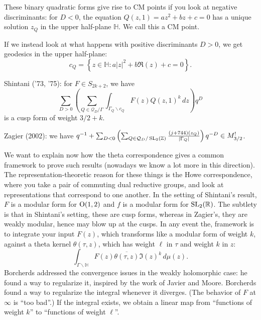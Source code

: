 \documentclass[reqno]{amsart} 
\numberwithin{theorem}{section}
\numberwithin{equation}{section}
\begin{document}
These binary quadratic forms give rise to CM points if you look at negative discriminants: for $D < 0$, the equation $Q(z, 1) = a z^2 + b z + c = 0$ has a unique solution $z_Q$ in the upper half-plane $\mathbb{H}$.  We call this a CM point.

If we instead look at what happens with positive discriminants $D > 0$, we get geodesics in the upper half-plane:
\begin{equation*}
  c_Q = \left\{ z \in \mathbb{H} : a \lvert z \rvert^2 + b \Re(z) + c = 0 \right\}.
\end{equation*}

Shintani ('73, '75): for $F \in S_{2 k + 2}$, we have
\begin{equation*}
  \sum_{D > 0} \left( \sum_{Q \in \mathcal{Q}_D / \Gamma}
    \int_{\Gamma_Q \backslash c_Q}
    F(z) Q(z, 1)^k \, d z
  \right) q^D
\end{equation*}
is a cusp form of weight $3/2 + k$.

Zagier (2002): we have $q^{-1} + \sum_{D < 0} \left( \sum_{Q \in \mathcal{Q}_D / \operatorname{SL}_2(\mathbb{Z})} \frac{(j + 744)(z_Q)}{\lvert \Gamma_Q \rvert} \right) q^{- D} \in M_{3/2}^{!}$.

We want to explain now how the theta correspondence gives a common framework to prove such results (nowadays we know a lot more in this direction).  The representation-theoretic reason for these things is the Howe correspondence, where you take a pair of commuting dual reductive groups, and look at representations that correspond to one another.  In the setting of Shintani's result, $F$ is a modular form for $\operatorname{O}(1, 2)$ and $f$ is a modular form for $\operatorname{SL}_2(\mathbb{R})$.  The subtlety is that in Shintani's setting, these are cusp forms, whereas in Zagier's, they are weakly modular, hence may blow up at the cusps.  In any event the, framework is to integrate your input $F(z)$, which transforms like a modular form of weight $k$, against a theta kernel $\theta(\tau, z)$, which has weight $\ell$ in $\tau$ and weight $k$ in $z$:
\begin{equation*}
  \int_{\Gamma \backslash \mathbb{H}} F(z) \overline{\theta(\tau, z)} \Im(z)^k \, d \mu(z).
\end{equation*}
Borcherds addressed the convergence issues in the weakly holomorphic case: he found a way to regularize it, inspired by the work of Javier and Moore.  Borcherds found a way to regularize the integral whenever it diverges.  (The behavior of $F$ at $\infty$ is ``too bad''.)  If the integral exists, we obtain a linear map from ``functions of weight $k$'' to ``functions of weight $\ell$''.
\end{document}
